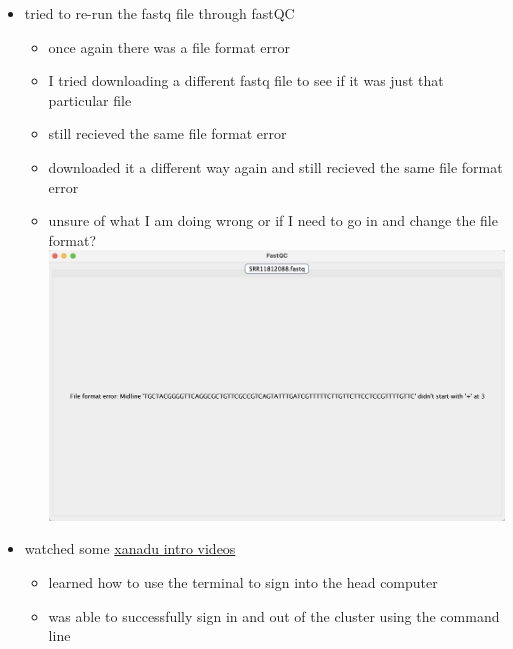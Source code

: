 \documentclass[
]{article}
\providecommand{\tightlist}{%
  \setlength{\itemsep}{0pt}\setlength{\parskip}{0pt}}
\begin{document}
\begin{itemize}
\tightlist
\item
  tried to re-run the fastq file through fastQC

  \begin{itemize}
  \tightlist
  \item
    once again there was a file format error
  \item
    I tried downloading a different fastq file to see if it was just
    that particular file
  \item
    still recieved the same file format error
  \item
    downloaded it a different way again and still recieved the same file
    format error
  \item
    unsure of what I am doing wrong or if I need to go in and change the
    file format?
    \includegraphics{images/fastq-file-error-message_09-19-24.png}
  \end{itemize}
\item
  watched some
  \href{https://github.com/CBC-UCONN/CBC_Docs/wiki/Intro-to-Xanadu-Videos}{xanadu
  intro videos}

  \begin{itemize}
  \tightlist
  \item
    learned how to use the terminal to sign into the head computer
  \item
    was able to successfully sign in and out of the cluster using the
    command line
  \end{itemize}
\end{itemize}
\end{document}
